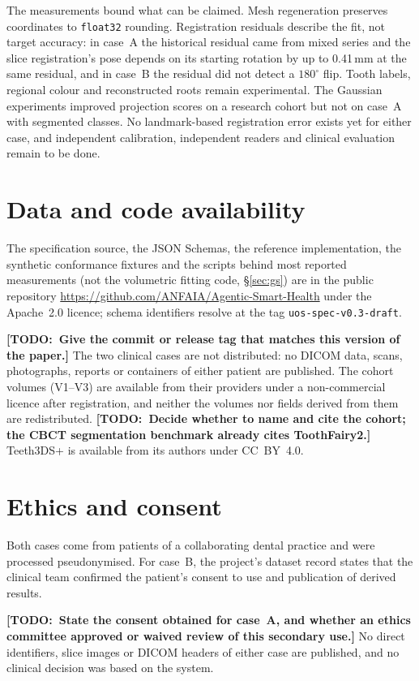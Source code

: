 \documentclass[11pt,a4paper]{article}
\newcommand{\code}[1]{\texttt{\small #1}}
\newif\iffinal \finalfalse
\newcommand{\todo}[1]{\iffinal\errmessage{Unresolved TODO left in the paper}\else
  {\color{red}\bfseries[TODO:~#1]}\fi}
\begin{document}
The measurements bound what can be claimed. Mesh regeneration preserves coordinates to
\code{float32} rounding. Registration residuals describe the fit, not target accuracy: in
case~A the historical residual came from mixed series and the slice registration's pose
depends on its starting rotation by up to 0.41\,mm at the same residual, and in case~B the
residual did not detect a $180^\circ$ flip. Tooth labels, regional colour and reconstructed roots remain
experimental. The Gaussian experiments improved projection scores on a research cohort but
not on case~A with segmented classes. No landmark-based registration error exists yet for
either case, and independent calibration, independent readers and clinical evaluation remain
to be done.

\section*{Data and code availability}

The specification source, the JSON Schemas, the reference implementation, the synthetic
conformance fixtures and the scripts behind most reported measurements (not the volumetric
fitting code, \S\ref{sec:gs}) are in the public
repository \url{https://github.com/ANFAIA/Agentic-Smart-Health} under the Apache~2.0
licence; schema identifiers resolve at the tag \code{uos-spec-v0.3-draft}.
\todo{Give the commit or release tag that matches this version of the paper.} The two
clinical cases are not distributed: no DICOM data, scans, photographs, reports or containers
of either patient are published. The cohort volumes (V1--V3) are available from their
providers under a non-commercial licence after registration, and neither the volumes nor
fields derived from them are redistributed. \todo{Decide whether to name and cite the cohort;
the CBCT segmentation benchmark already cites ToothFairy2.} Teeth3DS+ \cite{teeth3ds} is
available from its authors under CC~BY~4.0.

\section*{Ethics and consent}

Both cases come from patients of a collaborating dental practice and were processed
pseudonymised. For case~B, the project's dataset record states that the clinical team
confirmed the patient's consent to use and publication of derived results.
\todo{State the consent obtained for case~A, and whether an ethics committee approved or
waived review of this secondary use.} No direct identifiers, slice images or DICOM headers of
either case are published, and no clinical decision was based on the system.
\end{document}
